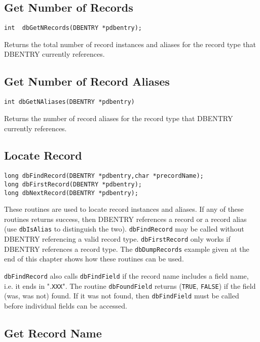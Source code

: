 \subsection{Get Number of Records}

\begin{verbatim}int  dbGetNRecords(DBENTRY *pdbentry);
\end{verbatim}Returns the total number of record instances and aliases for the record type that DBENTRY currently references.

\subsection{Get Number of Record Aliases}

\begin{verbatim}int dbGetNAliases(DBENTRY *pdbentry)
\end{verbatim}Returns the number of record aliases for the record type that DBENTRY currently references.

\subsection{Locate Record}

\begin{verbatim}long dbFindRecord(DBENTRY *pdbentry,char *precordName);
long dbFirstRecord(DBENTRY *pdbentry);
long dbNextRecord(DBENTRY *pdbentry);
\end{verbatim}
These routines are used to locate record instances and aliases. If any of these routines returns success, then DBENTRY 
references a record or a record alias (use \verb|dbIsAlias| to distinguish the two). \verb|dbFindRecord| may be called without 
DBENTRY referencing a valid record type. \verb|dbFirstRecord| only works if DBENTRY references a record type. The 
\verb|dbDumpRecords| example given at the end of this chapter shows how these routines can be used.

\verb|dbFindRecord| also calls \verb|dbFindField| if the record name includes a field name, i.e. it ends in ".\verb|XXX|". The routine 
\verb|dbFoundField| returns (\verb|TRUE|, \verb|FALSE|) if the field (was, was not) found. If it was not found, then \verb|dbFindField| must 
be called before individual fields can be accessed.

\subsection{Get Record Name}

